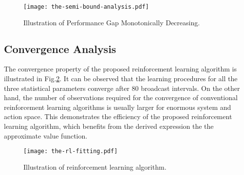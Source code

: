 \begin{figure}[ht!]                                                                             %
    \centering                                                                                  %
    \texttt{[image: the-semi-bound-analysis.pdf]}                     %
    \caption{Illustration of Performance Gap Monotonically Decreasing.}
    \label{fig:semi-bound}                                                                %
\end{figure}                                                                                    %

\subsection{Convergence Analysis}
\label{subsec:converge}
The convergence property of the proposed reinforcement learning algorithm is illustrated in Fig.\ref{fig:rl_plot}.
It can be observed that the learning procedures for all the three statistical parameters converge after $80$ broadcast intervals.
On the other hand, the number of observations required for the convergence of conventional reinforcement learning algorithms is usually larger for enormous system and action space.
This demonstrates the efficiency of the proposed reinforcement learning algorithm, which benefits from the derived expression the the approximate value function.
\begin{figure}[ht!]
    \centering
    \texttt{[image: the-rl-fitting.pdf]}
    \caption{Illustration of reinforcement learning algorithm.} 
    \label{fig:rl_plot}
\end{figure}

